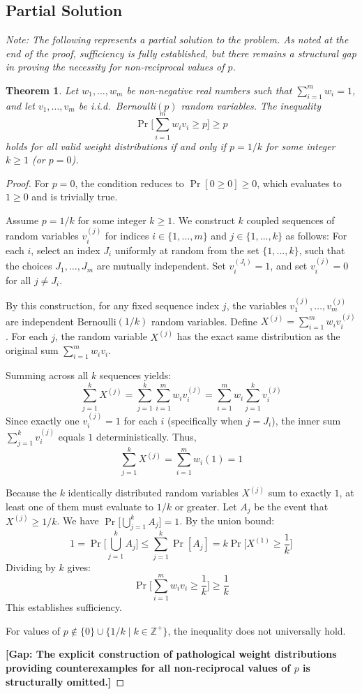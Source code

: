 \documentclass[12pt]{article}
\newtheorem{theorem}{Theorem}
\begin{document}
\subsection*{Partial Solution}

\textit{Note: The following represents a partial solution to the problem. As noted at the end of the proof, sufficiency is fully established, but there remains a structural gap in proving the necessity for non-reciprocal values of $p$.}

\begin{theorem}
Let $w_1, \ldots, w_m$ be non-negative real numbers such that $\sum_{i=1}^m w_i = 1$, and let $v_1, \ldots, v_m$ be i.i.d.\ Bernoulli$(p)$ random variables. The inequality 
\[\Pr\Big[\sum_{i=1}^m w_i v_i\geq p\Big]\geq p\]
holds for all valid weight distributions if and only if $p = 1/k$ for some integer $k \ge 1$ (or $p=0$).
\end{theorem}

\begin{proof}
For $p = 0$, the condition reduces to $\Pr[0 \ge 0] \ge 0$, which evaluates to $1 \ge 0$ and is trivially true.

Assume $p = 1/k$ for some integer $k \ge 1$. 
We construct $k$ coupled sequences of random variables $v_i^{(j)}$ for indices $i \in \{1, \dots, m\}$ and $j \in \{1, \dots, k\}$ as follows:
For each $i$, select an index $J_i$ uniformly at random from the set $\{1, \dots, k\}$, such that the choices $J_1, \ldots, J_m$ are mutually independent. 
Set $v_i^{(J_i)} = 1$, and set $v_i^{(j)} = 0$ for all $j \neq J_i$.

By this construction, for any fixed sequence index $j$, the variables $v_1^{(j)}, \ldots, v_m^{(j)}$ are independent Bernoulli$(1/k)$ random variables. 
Define $X^{(j)} = \sum_{i=1}^m w_i v_i^{(j)}$. 
For each $j$, the random variable $X^{(j)}$ has the exact same distribution as the original sum $\sum_{i=1}^m w_i v_i$.

Summing across all $k$ sequences yields:
\[\sum_{j=1}^k X^{(j)} = \sum_{j=1}^k \sum_{i=1}^m w_i v_i^{(j)} = \sum_{i=1}^m w_i \sum_{j=1}^k v_i^{(j)}\]
Since exactly one $v_i^{(j)} = 1$ for each $i$ (specifically when $j = J_i$), the inner sum $\sum_{j=1}^k v_i^{(j)}$ equals $1$ deterministically.
Thus,
\[\sum_{j=1}^k X^{(j)} = \sum_{i=1}^m w_i (1) = 1\]

Because the $k$ identically distributed random variables $X^{(j)}$ sum to exactly $1$, at least one of them must evaluate to $1/k$ or greater. 
Let $A_j$ be the event that $X^{(j)} \ge 1/k$. We have $\Pr\Big[\bigcup_{j=1}^k A_j\Big] = 1$.
By the union bound:
\[ 1 = \Pr\Big[\bigcup_{j=1}^k A_j\Big] \le \sum_{j=1}^k \Pr[A_j] = k \Pr\Big[X^{(1)} \ge \frac{1}{k}\Big] \]
Dividing by $k$ gives:
\[ \Pr\Big[\sum_{i=1}^m w_i v_i \ge \frac{1}{k}\Big] \ge \frac{1}{k} \]
This establishes sufficiency.

For values of $p \notin \{0\} \cup \{1/k \mid k \in \mathbb{Z}^+\}$, the inequality does not universally hold.

\vspace{\baselineskip}
\noindent\textbf{[Gap: The explicit construction of pathological weight distributions providing counterexamples for all non-reciprocal values of $p$ is structurally omitted.]}
\end{proof}
\end{document}
